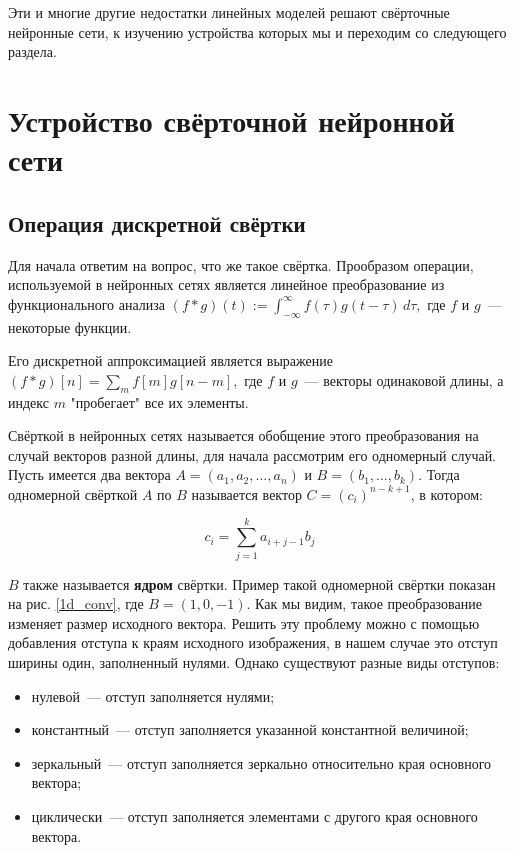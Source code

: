 \documentclass[12pt, fleqn]{article}
\begin{document}
    Эти и многие другие недостатки линейных моделей решают свёрточные нейронные сети, к изучению устройства которых мы и переходим со 
    следующего раздела.

    \section{Устройство свёрточной нейронной сети}

    \subsection{Операция дискретной свёртки}

    Для начала ответим на вопрос, что же такое свёртка. Прообразом операции, используемой в нейронных сетях является линейное преобразование 
    из функционального анализа $(f*g)(t):=\int_{-\infty }^{\infty }f(\tau )g(t-\tau )\,d\tau,$ где $f$ и $g$~--- некоторые функции.

    Его дискретной аппроксимацией является выражение $(f*g)[n]=\sum_mf[m]g[n-m],$ где $f$ и $g$~--- векторы 
    одинаковой длины, а индекс $m$ "пробегает" все их элементы.

    Свёрткой в нейронных сетях называется обобщение этого преобразования на случай векторов разной длины, для начала
    рассмотрим его одномерный случай. Пусть имеется два вектора $A = (a_1,a_2,\dots,a_n)$ и
    $B = (b_1,\dots,b_k)$. Тогда одномерной свёрткой $A$ по $B$ называется вектор $C = (c_{i})^{n - k + 1}$, в котором:
    
    $$c_i = \sum_{j=1}^{k}a_{i + j - 1}b_{j}$$

    $B$ также называется \textbf{ядром} свёртки. Пример такой одномерной свёртки показан на рис. \ref{1d_conv}, где $B=(1,0,-1)$. 
    Как мы видим, такое преобразование изменяет размер исходного вектора. Решить эту проблему можно с помощью добавления отступа к 
    краям исходного изображения, в нашем случае это отступ ширины один, заполненный нулями.
    Однако существуют разные виды отступов:
    \begin{itemize}
        \item нулевой~--- отступ заполняется нулями;
        \item константный~--- отступ заполняется указанной константной величиной;
        \item зеркальный~--- отступ заполняется зеркально относительно края основного вектора;
        \item циклически~--- отступ заполняется элементами с другого края основного вектора.
    \end{itemize}
\end{document}

